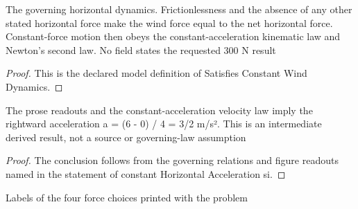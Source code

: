 \begin{definition}
  \label{def:physics:phyx-mini-0801:phyxminiproblems-problemphyxmini0801-satisfiesconstantwinddynamics}
  The governing horizontal dynamics. Frictionlessness and the absence of any other stated horizontal force make the wind force equal to the net horizontal force. Constant-force motion then obeys the constant-acceleration kinematic law and Newton's second law. No field states the requested 300 N result
\end{definition}
\begin{proof}
  This is the declared model definition of Satisfies Constant Wind Dynamics.
\end{proof}
\begin{lemma}
  \label{lem:physics:phyx-mini-0801:phyxminiproblems-problemphyxmini0801-constanthorizontalacceleration-si}
  The prose readouts and the constant-acceleration velocity law imply the rightward acceleration a = (6 - 0) / 4 = 3/2 m/s². This is an intermediate derived result, not a source or governing-law assumption
\end{lemma}
\begin{proof}
  The conclusion follows from the governing relations and figure readouts named in the statement of constant Horizontal Acceleration si.
\end{proof}
\begin{definition}
  \label{def:physics:phyx-mini-0801:phyxminiproblems-problemphyxmini0801-answerchoice}
  Labels of the four force choices printed with the problem
\end{definition}
